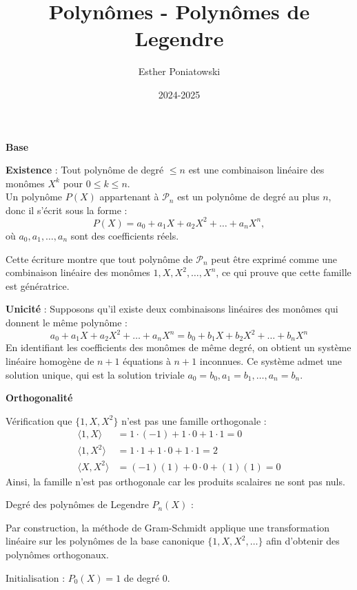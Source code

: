 \documentclass[10pt,a4paper]{article}
\title{Polynômes - Polynômes de Legendre}
\author{Esther Poniatowski}
\date{2024-2025}
\begin{document}
\bigskip
\textbf{Base}

\q \textbf{Existence} : Tout polynôme de degré $\leq n$ est une combinaison linéaire des monômes
$X^k$ pour $0 \leq k \leq n$.\\
Un polynôme \( P(X) \) appartenant à \( \mathcal{P}_n \) est un polynôme de degré au plus
\( n \), donc il s'écrit sous la forme :
\[
P(X) = a_0 + a_1 X + a_2 X^2 + \dots + a_n X^n,
\]
où \( a_0, a_1, \dots, a_n \) sont des coefficients réels.

Cette écriture  montre que tout polynôme de \( \mathcal{P}_n \) peut être exprimé comme une
combinaison linéaire des monômes \( 1, X, X^2, \dots, X^n \), ce qui prouve que cette famille est
génératrice.

\textbf{Unicité} : Supposons qu'il existe deux combinaisons linéaires des monômes qui donnent le
même polynôme :
\[
a_0 + a_1 X + a_2 X^2 + \dots + a_n X^n = b_0 + b_1 X + b_2 X^2 + \dots + b_n X^n
\]
En identifiant les coefficients des monômes de même degré, on obtient un système linéaire homogène
de \( n+1 \) équations à \( n+1 \) inconnues. Ce système admet une solution unique, qui est la
solution triviale \( a_0 = b_0, a_1 = b_1, \dots, a_n = b_n \).


\bigskip
\textbf{Orthogonalité}

\q Vérification que $\{1, X, X^2\}$ n'est pas une famille orthogonale :
\begin{align*}
\langle 1, X \rangle &= 1 \cdot (-1) + 1 \cdot 0 + 1 \cdot 1 = 0 \\
\langle 1, X^2 \rangle &= 1 \cdot 1 + 1 \cdot 0 + 1 \cdot 1 = 2 \\
\langle X, X^2 \rangle &= (-1)(1) + 0 \cdot 0 + (1)(1) = 0
\end{align*}
Ainsi, la famille n'est pas orthogonale car les produits scalaires ne sont pas nuls.

\q Degré des polynômes de Legendre \( P_n(X) \) :

Par construction, la méthode de Gram-Schmidt applique une transformation linéaire sur les polynômes
de la base canonique \( \{1, X, X^2, \dots\} \) afin d'obtenir des polynômes orthogonaux.

Initialisation : $P_0(X) = 1$ de degré 0.
\end{document}
